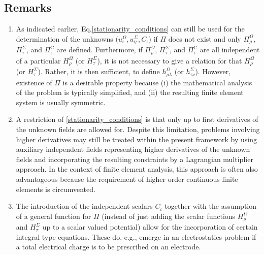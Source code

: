 \documentclass[pdftex,a4paper,12pt,abstracton]{scrartcl}
\begin{document}
\subsection{Remarks}
\label{remarks}
\begin{enumerate}
\item As indicated earlier, Eq.\@ \eqref{stationarity_conditions} can still be used for the determination of the unknowns $(u^\Omega_\epsilon, u^\Sigma_\eta, C_\iota$) if $\Pi$ does not exist and only $\Pi^\Omega_\rho$, $\Pi^\Sigma_\tau$, and $\Pi^\mathrm{C}_\iota$ are defined. Furthermore, if $\Pi^\Omega_\rho$, $\Pi^\Sigma_\tau$, and $\Pi^\mathrm{C}_\iota$ are all independent of a particular $H^\Omega_\rho$ (or $H^\Sigma_\tau$), it is not necessary to give a relation for that $H^\Omega_\rho$ (or $H^\Sigma_\tau$). Rather, it is then sufficient, to define $h^\Omega_{\rho\lambda}$ (or $h^\Sigma_{\tau\nu}$). However, existence of $\Pi$ is a desirable property because (i) the mathematical analysis of the problem is typically simplified, and (ii) the resulting finite element system is usually symmetric.

\item A restriction of \eqref{stationarity_conditions} is that only up to first derivatives of the unknown fields are allowed for. Despite this limitation, problems involving higher derivatives may still be treated within the present framework by using auxiliary independent fields representing higher derivatives of the unknown fields and incorporating the resulting constraints by a Lagrangian multiplier approach. In the context of finite element analysis, this approach is often also advantageous because the requirement of higher order continuous finite elements is circumvented.

\item The introduction of the independent scalars $C_\iota$ together with the assumption of a general function for $\Pi$ (instead of just adding the scalar functions $H^\Omega_\rho$ and $H^\Sigma_\tau$ up to a scalar valued potential) allow for the incorporation of certain integral type equations. These do, e.g., emerge in an electrostatics problem if a total electrical charge is to be prescribed on an electrode.
\end{enumerate}
\end{document}
